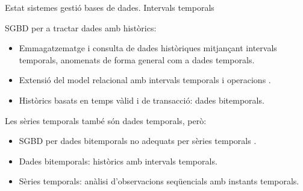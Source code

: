 \begin{frame}{Estat sistemes gestió bases de dades. Intervals temporals}

  SGBD per a tractar dades amb històrics:

  \begin{itemize}  

  \item Emmagatzematge i consulta de dades històriques mitjançant
    intervals temporals, anomenats de forma general com a dades
    temporals.

  \item Extensió del model relacional amb intervals temporals i
    operacions \parencite{date02:_tempor_data_relat_model}.

  \item Històrics basats en temps vàlid i de transacció: dades
    bitemporals.

  \end{itemize}
  
  Les sèries temporals també són dades temporals, però:

  \begin{itemize}  

  \item SGBD per dades bitemporals no adequats per sèries
    temporals \parencite{schmidt95}.

  \item Dades bitemporals: històrics amb intervals temporals.

  \item Sèries temporals: anàlisi d'observacions seqüencials amb
    instants temporals.

  \end{itemize}
    


\end{frame}



